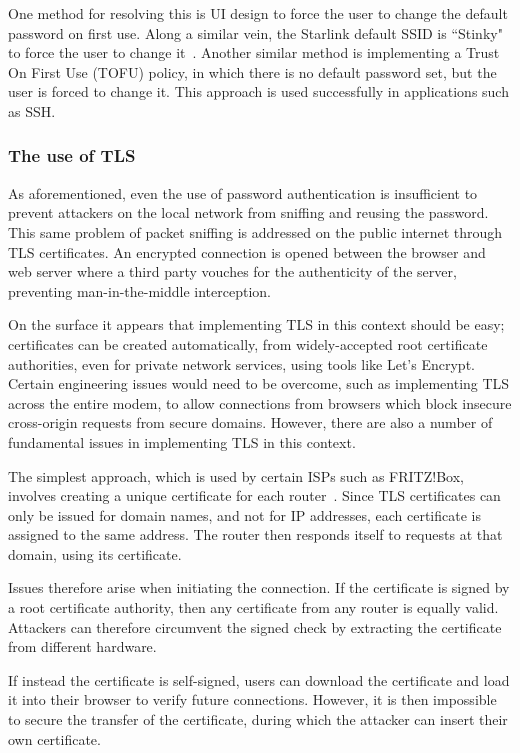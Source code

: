 One method for resolving this is UI design to force the user to change the default password on first use.
Along a similar vein, the Starlink default SSID is ``Stinky" to force the user to change it~\cite{stinky_starlink}.
Another similar method is implementing a Trust On First Use (TOFU) policy, in which there is no default password set, but the user is forced to change it.
This approach is used successfully in applications such as SSH.

\subsubsection{The use of TLS}

As aforementioned, even the use of password authentication is insufficient to prevent attackers on the local network from sniffing and reusing the password.
This same problem of packet sniffing is addressed on the public internet through TLS certificates.
An encrypted connection is opened between the browser and web server where a third party vouches for the authenticity of the server, preventing man-in-the-middle interception.

On the surface it appears that implementing TLS in this context should be easy; certificates can be created automatically, from widely-accepted root certificate authorities, even for private network services, using tools like Let's Encrypt.
Certain engineering issues would need to be overcome, such as implementing TLS across the entire modem, to allow connections from browsers which block insecure cross-origin requests from secure domains.
However, there are also a number of fundamental issues in implementing TLS in this context.

The simplest approach, which is used by certain ISPs such as FRITZ!Box, involves creating a unique certificate for each router~\cite{fritzbox_cert}.
Since TLS certificates can only be issued for domain names, and not for IP addresses, each certificate is assigned to the same address.
The router then responds itself to requests at that domain, using its certificate.

Issues therefore arise when initiating the connection.
If the certificate is signed by a root certificate authority, then any certificate from any router is equally valid.
Attackers can therefore circumvent the signed check by extracting the certificate from different hardware.

If instead the certificate is self-signed, users can download the certificate and load it into their browser to verify future connections.
However, it is then impossible to secure the transfer of the certificate, during which the attacker can insert their own certificate.

